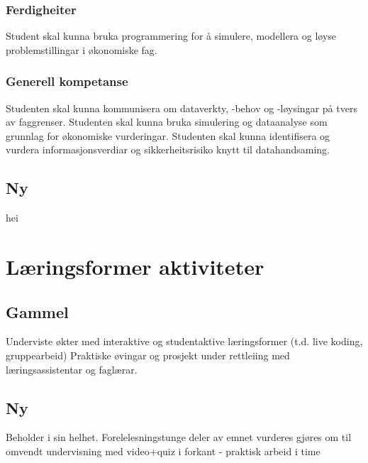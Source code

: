 \documentclass[12pt, titlepage]{article}
\begin{document}
\subsubsection*{Ferdigheiter}

    Student skal kunna bruka programmering for å simulere, modellera og løyse problemstillingar i økonomiske fag.

\subsubsection*{Generell kompetanse}

    Studenten skal kunna kommunisera om dataverkty, -behov og -løysingar på tvers av faggrenser.
    Studenten skal kunna bruka simulering og dataanalyse som grunnlag for økonomiske vurderingar.
    Studenten skal kunna identifisera og vurdera informasjonsverdiar og sikkerheitsrisiko knytt til datahandsaming.
   
\subsection*{Ny}
hei


\section*{Læringsformer aktiviteter}
\subsection*{Gammel}
    Underviste økter med interaktive og studentaktive læringsformer (t.d. live koding, gruppearbeid)
    Praktiske øvingar og prosjekt under rettleiing med læringsassistentar og faglærar.

\subsection*{Ny}

Beholder i sin helhet.
Forelelesningstunge deler av emnet vurderes gjøres om til omvendt undervisning med video+quiz i forkant - praktisk arbeid i time
\end{document}
